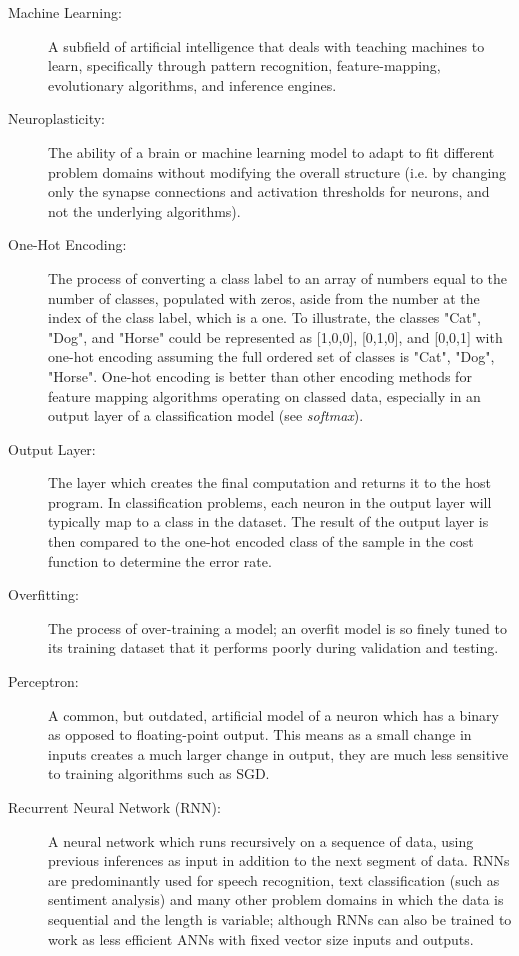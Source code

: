 \documentclass[]{report}
\begin{document}
\begin{description}
\item[Machine Learning:] A subfield of artificial intelligence that deals with teaching machines to learn, specifically through pattern recognition, feature-mapping, evolutionary algorithms, and inference engines.

\item[Neuroplasticity:] The ability of a brain or machine learning model to adapt to fit different problem domains without modifying the overall structure (i.e. by changing only the synapse connections and activation thresholds for neurons, and not the underlying algorithms).

\item[One-Hot Encoding:] The process of converting a class label to an array of numbers equal to the number of classes, populated with zeros, aside from the number at the index of the class label, which is a one. To illustrate, the classes "Cat", "Dog", and "Horse" could be represented as [1,0,0], [0,1,0], and [0,0,1] with one-hot encoding assuming the full ordered set of classes is {"Cat", "Dog", "Horse"}. One-hot encoding is better than other encoding methods for feature mapping algorithms operating on classed data, especially in an output layer of a classification model (see \emph{softmax}).

\item[Output Layer:] The layer which creates the final computation and returns it to the host program. In classification problems, each neuron in the output layer will typically map to a class in the dataset. The result of the output layer is then compared to the one-hot encoded class of the sample in the cost function to determine the error rate.

\item[Overfitting:] The process of over-training a model; an overfit model is so finely tuned to its training dataset that it performs poorly during validation and testing.

\item[Perceptron:] A common, but outdated, artificial model of a neuron which has a binary as opposed to floating-point output. This means as a small change in inputs creates a much larger change in output, they are much less sensitive to training algorithms such as SGD.

\item[Recurrent Neural Network (RNN):] A neural network which runs recursively on a sequence of data, using previous inferences as input in addition to the next segment of data. RNNs are predominantly used for speech recognition, text classification (such as sentiment analysis) and many other problem domains in which the data is sequential and the length is variable; although RNNs can also be trained to work as less efficient ANNs with fixed vector size inputs and outputs.


\end{description}
\end{document}

